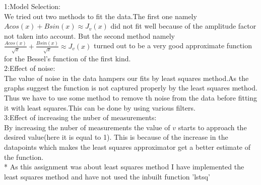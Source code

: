 \documentclass[11pt]{article}
\begin{document}
1:Model Selection:\\ We tried out two methods to fit the data.The first
one namely \(Acos(x)+Bsin(x)\approx J_v(x)\) did not fit well because of
the amplitude factor not taken into account. But the second method
namely
\(\frac{Acos(x)}{\sqrt{x}}+\frac{Bsin(x)}{\sqrt{x}}\approx J_v(x)\)
turned out to be a very good approximate function for the Bessel's
function of the first kind. \\2:Effect of noise: \\The value of noise in the
data hampers our fits by least squares method.As the graphs suggest the
function is not captured properly by the least squares method. Thus we
have to use some method to remove th noise from the data before fitting
it with least squares.This can be done by using various filters.\\
3:Effect of increasing the nuber of measurements: \\By increasing the
nuber of measurements the value of \(v\) starts to approach the desired
value(here it is equal to 1). This is because of the increase in the
datapoints which makes the least squares approximator get a better
estimate of the function.\\
* As this assignment was about least squares method I have implemented the least squares method and have not used the inbuilt function 'lstsq'

    
    
    
    
\end{document}
